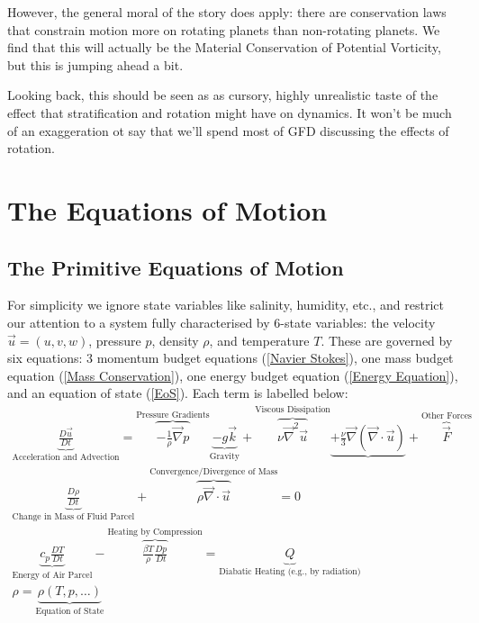 However, the general moral of the story does apply: there are conservation laws that constrain motion more on rotating planets than non-rotating planets. We find that this will actually be the Material Conservation of Potential Vorticity, but this is jumping ahead a bit.

Looking back, this should be seen as as cursory, highly unrealistic taste of the effect that stratification and rotation might have on dynamics. It won't be much of an exaggeration ot say that we'll spend most of GFD discussing the effects of rotation.

\chapter{The Equations of Motion}\label{EoM GFD}

\section{The Primitive Equations of Motion}

For simplicity we ignore state variables like salinity, humidity, etc., and restrict our attention to a system fully characterised by 6-state variables: the velocity $\vec{u}=(u,v,w)$, pressure $p$, density $\rho$, and temperature $T$. These are governed by six equations: 3 momentum budget equations (\ref{Navier Stokes}), one mass budget equation (\ref{Mass Conservation}), one energy budget equation (\ref{Energy Equation}), and an equation of state (\ref{EoS}). Each term is labelled below:
\begin{gather}
    \boxed{\underbrace{\frac{D\vec{u}}{Dt}}_{\text{Acceleration and Advection}}
    =\overbrace{-\frac{1}{\rho}\vec{\nabla}p}^\text{Pressure Gradients}\underbrace{-g\vec{k}}_\text{Gravity}+\overbrace{\nu\vec{\nabla}^2\vec{u}}^\text{Viscous Dissipation}\underbrace{+\frac{\nu}{3}\vec{\nabla}(\vec{\nabla}\cdot\vec{u})}_\text{}+\overbrace{\vec{F}}^\text{Other Forces}}
    \label{Navier Stokes}
    \\
    \boxed{\underbrace{\frac{D\rho}{Dt}}_\text{Change in Mass of Fluid Parcel}
    +
    \overbrace{\rho\vec{\nabla}\cdot\vec{u}}^\text{Convergence/Divergence of Mass}=0}
    \label{Mass Conservation}
    \\
    \boxed{\underbrace{c_p\frac{DT}{Dt}}_\text{Energy of Air Parcel}-\overbrace{\frac{\beta T}{\rho}\frac{Dp}{Dt}}^\text{Heating by Compression}=\underbrace{Q}_\text{Diabatic Heating (e.g., by radiation)}}
    \label{Energy Equation}
    \\
    \boxed{\rho=\underbrace{\rho(T,p,\ldots)}_{\text{Equation of State}}}
    \label{EoS}
\end{gather}

